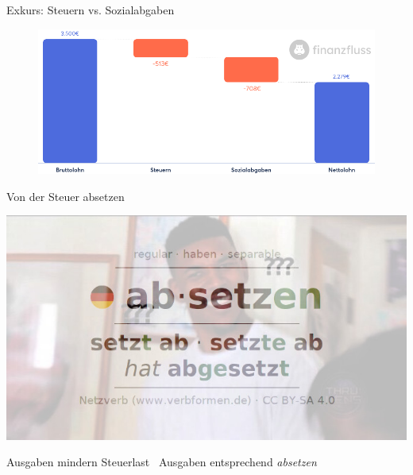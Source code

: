 \documentclass{beamer}
\begin{document}
			\begin{frame}{Exkurs: Steuern vs. Sozialabgaben}
				\begin{center}
					\vspace{-0.5cm}
					\begin{figure}
						\includegraphics[width=0.8\linewidth]{images/steuerrechner}
					\end{figure}
				\end{center}
			\end{frame}
			
			\begin{frame}{Von der Steuer absetzen}
				\begin{center}
					\includegraphics[width=0.75\linewidth]{images/absetzen}
				\end{center}
				\pause
				Ausgaben mindern Steuerlast \textrightarrow\ Ausgaben entsprechend \textit{absetzen}
			\end{frame}
		
\end{document}
